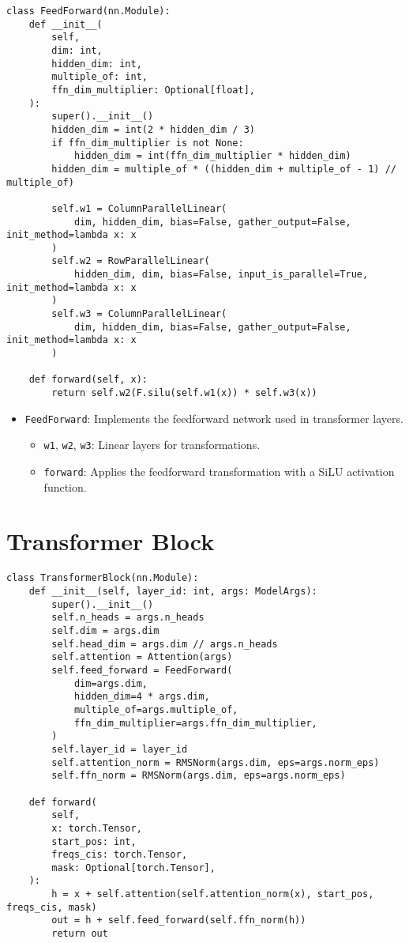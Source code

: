 \begin{lstlisting}
class FeedForward(nn.Module):
    def __init__(
        self,
        dim: int,
        hidden_dim: int,
        multiple_of: int,
        ffn_dim_multiplier: Optional[float],
    ):
        super().__init__()
        hidden_dim = int(2 * hidden_dim / 3)
        if ffn_dim_multiplier is not None:
            hidden_dim = int(ffn_dim_multiplier * hidden_dim)
        hidden_dim = multiple_of * ((hidden_dim + multiple_of - 1) // multiple_of)

        self.w1 = ColumnParallelLinear(
            dim, hidden_dim, bias=False, gather_output=False, init_method=lambda x: x
        )
        self.w2 = RowParallelLinear(
            hidden_dim, dim, bias=False, input_is_parallel=True, init_method=lambda x: x
        )
        self.w3 = ColumnParallelLinear(
            dim, hidden_dim, bias=False, gather_output=False, init_method=lambda x: x
        )

    def forward(self, x):
        return self.w2(F.silu(self.w1(x)) * self.w3(x))
\end{lstlisting}

\begin{itemize}
    \item \texttt{FeedForward}: Implements the feedforward network used in transformer layers.
    \begin{itemize}
        \item \texttt{w1}, \texttt{w2}, \texttt{w3}: Linear layers for transformations.
        \item \texttt{forward}: Applies the feedforward transformation with a SiLU activation function.
    \end{itemize}
\end{itemize}

\section{Transformer Block}

\begin{lstlisting}
class TransformerBlock(nn.Module):
    def __init__(self, layer_id: int, args: ModelArgs):
        super().__init__()
        self.n_heads = args.n_heads
        self.dim = args.dim
        self.head_dim = args.dim // args.n_heads
        self.attention = Attention(args)
        self.feed_forward = FeedForward(
            dim=args.dim,
            hidden_dim=4 * args.dim,
            multiple_of=args.multiple_of,
            ffn_dim_multiplier=args.ffn_dim_multiplier,
        )
        self.layer_id = layer_id
        self.attention_norm = RMSNorm(args.dim, eps=args.norm_eps)
        self.ffn_norm = RMSNorm(args.dim, eps=args.norm_eps)

    def forward(
        self,
        x: torch.Tensor,
        start_pos: int,
        freqs_cis: torch.Tensor,
        mask: Optional[torch.Tensor],
    ):
        h = x + self.attention(self.attention_norm(x), start_pos, freqs_cis, mask)
        out = h + self.feed_forward(self.ffn_norm(h))
        return out
\end{lstlisting}

